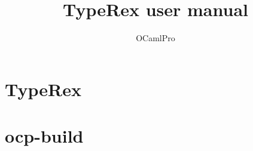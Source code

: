 \documentclass[12pt]{book}
\title{TypeRex user manual}
\author{OCamlPro}
\date{\today\\
\begin{latexonly}%
\vspace{3cm}
\end{latexonly}%
This manual presents the usage of \typerex, a development
environment and toolbox for OCaml developped by OCamlPro and Inria%
\footnote{with support from the Campus Paris Saclay fundation}.
}
\begin{document}

\newcommand{\typerex}{TypeRex}
\newcommand{\cmd}[1]{$\texttt{#1}$}
\begin{htmlonly}
\renewcommand{\paragraph}[1]{{\bf #1}}
\end{htmlonly}

\newcommand{\verbsize}{%BEGIN LATEX
\footnotesize%
}

\maketitle
\thispagestyle{empty}
\cleardoublepage

\newpage
\thispagestyle{empty}
\tableofcontents


\chapter{TypeRex}



\chapter{ocp-build}


\end{document}
